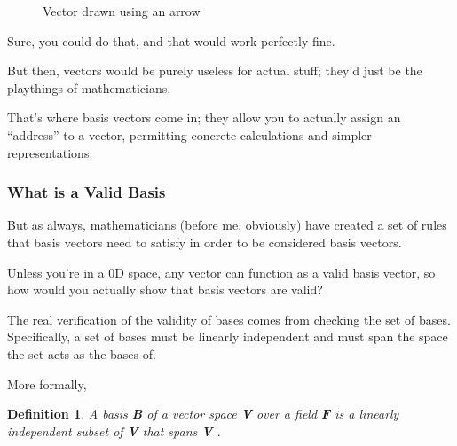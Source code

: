 \documentclass[12pt]{article}
\newtheorem{definition}{Definition}
\begin{document}
\begin{figure}[H]
    \centering
    \caption{Vector drawn using an arrow}
\end{figure}

Sure, you could do that, and that would work perfectly fine.

But then, vectors would be purely useless for actual stuff; they'd just be the playthings of mathematicians.

That's where basis vectors come in; they allow you to actually assign an ``address'' to a vector, permitting concrete calculations and simpler representations.

\subsubsection{What is a Valid Basis}

But as always, mathematicians (before me, obviously) have created a set of rules that basis vectors need to satisfy in order to be considered basis vectors.

Unless you're in a 0D space, any vector can function as a valid basis vector, so how would you actually show that basis vectors are valid?

The real verification of the validity of bases comes from checking the set of bases. Specifically, a set of bases must be linearly independent and must span the space the set acts as the bases of.

More formally,
\begin{definition}
    A basis \textbf{B} of a vector space \textbf{V} over a field \textbf{F} is a linearly independent subset of \textbf{V} that spans \textbf{V} \textup{\cite{enwiki:1373603812}}.
\end{definition}
\end{document}
